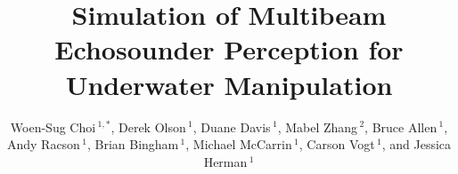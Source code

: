 \documentclass[utf8]{frontiersSCNS} %
\def\firstAuthorLast{Sample {et~al.}} %
\def\Authors{Woen-Sug Choi\,$^{1,*}$, Derek Olson\,$^{1}$, Duane Davis\,$^{1}$, Mabel Zhang\,$^{2}$, Bruce Allen\,$^{1}$, Andy Racson\,$^{1}$, Brian Bingham\,$^{1}$, Michael McCarrin\,$^{1}$, Carson Vogt\,$^{1}$, and Jessica Herman\,$^{1}$}
\begin{document}

\title[Running Title]{Simulation of Multibeam Echosounder Perception for Underwater Manipulation} 

\author[\firstAuthorLast ]{\Authors} %
\address{} %
\correspondance{} %

\extraAuth{}%

\maketitle
\end{document}
